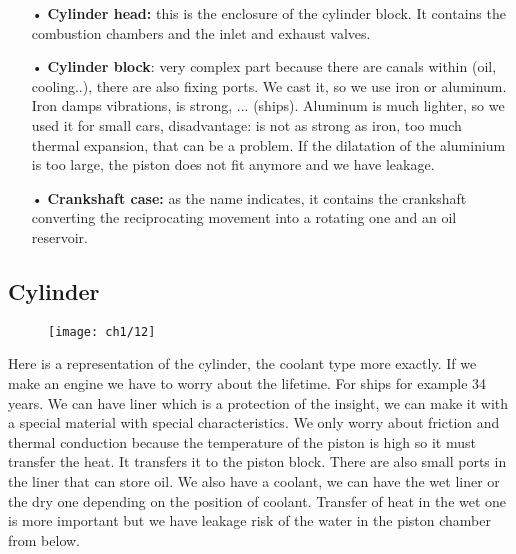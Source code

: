 			\begin{itemize}
				\item[•] \textbf{Cylinder head:}	this is the enclosure of the cylinder block. It contains the combustion chambers and the inlet and exhaust valves. \\		
			
				\item[•] \textbf{Cylinder block}: very complex part because there are canals within (oil, cooling..), there are also fixing ports. We cast it, so we use iron or aluminum. Iron damps vibrations, is strong, ... (ships). Aluminum is much lighter, so we used it for small cars, disadvantage: is not as strong as iron, too much thermal expansion, that can be a problem. If the dilatation of the aluminium is too large, the piston does not fit anymore and we have leakage. \\
				
				\item[•]	\textbf{Crankshaft case:} as the name indicates, it contains the crankshaft converting the reciprocating movement into a rotating one and an oil reservoir. 
			\end{itemize}						
			
			\subsection{Cylinder}
						
			\begin{wrapfigure}[10]{l}{6.5cm}
			\vspace{-5mm}
			\texttt{[image: ch1/12]}
			\end{wrapfigure}
			Here is a representation of the cylinder, the coolant type more exactly. If we make an engine we have to worry about the lifetime. For ships for example 34 years. We can have liner which is a protection of the insight, we can make it with a special material with special characteristics. We only worry about friction and thermal conduction because the temperature of the piston is high so it must transfer the heat. It transfers it to the piston block. There are also small ports in the liner that can store oil. We also have a coolant, we can have the wet liner or the dry one depending on the position of coolant. Transfer of heat in the wet one is more important but we have leakage risk of the water in the piston chamber from below.  

